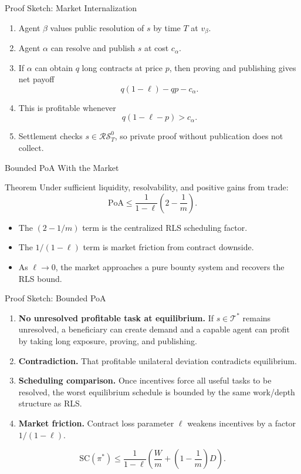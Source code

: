 \documentclass[10pt,aspectratio=169]{beamer}
\newcommand{\SC}{\mathrm{SC}}
\newcommand{\PoA}{\mathrm{PoA}}
\newcommand{\RS}{\mathcal{RS}}
\begin{document}
\begin{frame}{Proof Sketch: Market Internalization}
\small
\begin{enumerate}
  \item Agent $\beta$ values public resolution of $s$ by time $T$ at $v_\beta$.
  \item Agent $\alpha$ can resolve and publish $s$ at cost $c_\alpha$.
  \item If $\alpha$ can obtain $q$ long contracts at price $p$, then proving and publishing gives net payoff
  \[
  q(1-\ell)-qp-c_\alpha.
  \]
  \item This is profitable whenever
  \[
  q(1-\ell-p)>c_\alpha.
  \]
  \item Settlement checks $s\in\RS^0_T$, so private proof without publication does not collect.
\end{enumerate}
\end{frame}

\begin{frame}{Bounded PoA With the Market}
\small
\begin{block}{Theorem}
Under sufficient liquidity, resolvability, and positive gains from trade:
\[
\PoA \le \frac{1}{1-\ell}\left(2-\frac{1}{m}\right).
\]
\end{block}

\begin{itemize}
  \item The $(2-1/m)$ term is the centralized RLS scheduling factor.
  \item The $1/(1-\ell)$ term is market friction from contract downside.
  \item As $\ell\to0$, the market approaches a pure bounty system and recovers the RLS bound.
\end{itemize}
\end{frame}

\begin{frame}{Proof Sketch: Bounded PoA}
\small
\begin{enumerate}
  \item \textbf{No unresolved profitable task at equilibrium.} If $s\in\mathcal{T}^*$ remains unresolved, a beneficiary can create demand and a capable agent can profit by taking long exposure, proving, and publishing.
  \item \textbf{Contradiction.} That profitable unilateral deviation contradicts equilibrium.
  \item \textbf{Scheduling comparison.} Once incentives force all useful tasks to be resolved, the worst equilibrium schedule is bounded by the same work/depth structure as RLS.
  \item \textbf{Market friction.} Contract loss parameter $\ell$ weakens incentives by a factor $1/(1-\ell)$.
\end{enumerate}

\[
\SC(\pi^*)\le \frac{1}{1-\ell}\left(\frac{W}{m}+\left(1-\frac1m\right)D\right).
\]
\end{frame}
\end{document}
